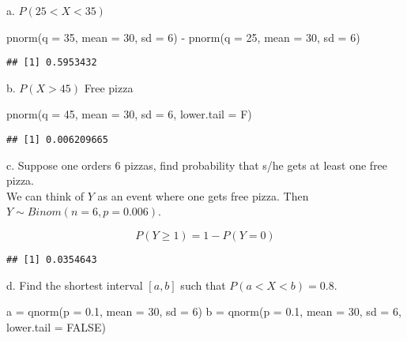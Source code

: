 \documentclass[
]{article}
\newenvironment{Shaded}{\begin{snugshade}}{\end{snugshade}}
\newcommand{\AttributeTok}[1]{\textcolor[rgb]{0.77,0.63,0.00}{#1}}
\newcommand{\ConstantTok}[1]{\textcolor[rgb]{0.00,0.00,0.00}{#1}}
\newcommand{\DecValTok}[1]{\textcolor[rgb]{0.00,0.00,0.81}{#1}}
\newcommand{\FloatTok}[1]{\textcolor[rgb]{0.00,0.00,0.81}{#1}}
\newcommand{\FunctionTok}[1]{\textcolor[rgb]{0.00,0.00,0.00}{#1}}
\newcommand{\NormalTok}[1]{#1}
\newcommand{\OtherTok}[1]{\textcolor[rgb]{0.56,0.35,0.01}{#1}}
\newcommand{\SpecialCharTok}[1]{\textcolor[rgb]{0.00,0.00,0.00}{#1}}
\begin{document}
a. \(P(25 < X < 35)\)\\

\begin{Shaded}
\begin{Highlighting}[]
\FunctionTok{pnorm}\NormalTok{(}\AttributeTok{q =} \DecValTok{35}\NormalTok{, }\AttributeTok{mean =} \DecValTok{30}\NormalTok{, }\AttributeTok{sd =} \DecValTok{6}\NormalTok{) }\SpecialCharTok{{-}} \FunctionTok{pnorm}\NormalTok{(}\AttributeTok{q =} \DecValTok{25}\NormalTok{, }\AttributeTok{mean =} \DecValTok{30}\NormalTok{, }\AttributeTok{sd =} \DecValTok{6}\NormalTok{)}
\end{Highlighting}
\end{Shaded}

\begin{verbatim}
## [1] 0.5953432
\end{verbatim}

b. \(P(X > 45)\) Free pizza

\begin{Shaded}
\begin{Highlighting}[]
\FunctionTok{pnorm}\NormalTok{(}\AttributeTok{q =} \DecValTok{45}\NormalTok{, }\AttributeTok{mean =} \DecValTok{30}\NormalTok{, }\AttributeTok{sd =} \DecValTok{6}\NormalTok{, }\AttributeTok{lower.tail =}\NormalTok{ F)}
\end{Highlighting}
\end{Shaded}

\begin{verbatim}
## [1] 0.006209665
\end{verbatim}

c. Suppose one orders 6 pizzas, find probability that s/he gets at least
one free pizza.\\
We can think of \(Y\) as an event where one gets free pizza. Then
\(Y \sim Binom(n=6, p=0.006)\).

\[
P(Y \ge 1) = 1 - P(Y=0) 
\]

\begin{verbatim}
## [1] 0.0354643
\end{verbatim}

d. Find the shortest interval \([a, b]\) such that
\(P(a < X < b) = 0.8\).

\begin{Shaded}
\begin{Highlighting}[]
\NormalTok{a }\OtherTok{=} \FunctionTok{qnorm}\NormalTok{(}\AttributeTok{p =} \FloatTok{0.1}\NormalTok{, }\AttributeTok{mean =} \DecValTok{30}\NormalTok{, }\AttributeTok{sd =} \DecValTok{6}\NormalTok{)}
\NormalTok{b }\OtherTok{=} \FunctionTok{qnorm}\NormalTok{(}\AttributeTok{p =} \FloatTok{0.1}\NormalTok{, }\AttributeTok{mean =} \DecValTok{30}\NormalTok{, }\AttributeTok{sd =} \DecValTok{6}\NormalTok{, }\AttributeTok{lower.tail =} \ConstantTok{FALSE}\NormalTok{)}
\end{Highlighting}
\end{Shaded}
\end{document}
